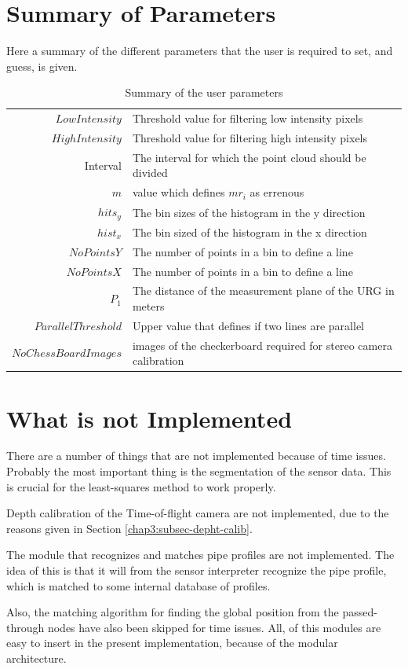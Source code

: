\section{Summary of Parameters}
Here a summary of the different parameters that the user is required to set, and guess, is
given. 
\begin{table}[htbp]
    \centering
    \begin{tabular}{|r|l|}
        \hline
        $LowIntensity$ &  Threshold value for filtering low intensity pixels   \\
        $HighIntensity$ & Threshold value for filtering high intensity pixels  \\
        Interval      &  The interval for which the point cloud should be divided \\
        $m$             &  value which defines $m r_i$ as errenous             \\
        \hline
        $hits_y$    &  The bin sizes of the histogram in the y direction       \\
        $hist_x$    &  The bin sized of the histogram in the x direction       \\
        $NoPointsY$ &  The number of points in a bin to define a line          \\
        $NoPointsX$ &  The number of points in a bin to define a line         \\
        $P_1$       &  The distance of the measurement plane of the URG in meters\\
        $ParallelThreshold$ &  Upper value that defines if two lines are parallel \\
        \hline
        $NoChessBoardImages$ & images of the checkerboard required for stereo camera calibration         \\
        \hline
    \end{tabular}
    \caption{Summary of the user parameters}
    \label{chap6:tab-user-parameters}
\end{table}

\section{What is not Implemented}
There are a number of things that are not implemented because of time issues. Probably the
most important thing is the segmentation of the sensor data. This is crucial for the
least-squares method to work properly. 

Depth calibration of the Time-of-flight camera are not implemented, due to the reasons
given in Section \ref{chap3:subsec-depht-calib}.

The module that recognizes and matches pipe profiles are not implemented. 
The idea of this is that it will from the sensor interpreter recognize the pipe
profile, which is matched to some internal database of profiles.

Also, the matching algorithm for finding the global position from the passed-through nodes
have also been skipped for time issues. All, of this modules are easy to insert in the
present implementation, because of the modular architecture. 


